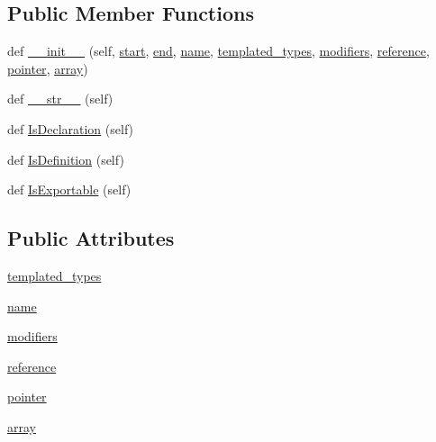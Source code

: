\subsection*{Public Member Functions}
\begin{DoxyCompactItemize}
\item 
def \hyperlink{classcpp_1_1ast_1_1_type_adc20d88db721b5d7b513c08a4d6753c9}{\+\_\+\+\_\+init\+\_\+\+\_\+} (self, \hyperlink{classcpp_1_1ast_1_1_node_a7b2aa97e6a049bb1a93aea48c48f1f44}{start}, \hyperlink{classcpp_1_1ast_1_1_node_a3c5e5246ccf619df28eca02e29d69647}{end}, \hyperlink{classcpp_1_1ast_1_1_type_a5905424e2b65f0215b6ecd73b4bfe24c}{name}, \hyperlink{classcpp_1_1ast_1_1_type_a7c38fcafa00dae6ee22bab783086a1a7}{templated\+\_\+types}, \hyperlink{classcpp_1_1ast_1_1_type_a0effa0a077eda79943e881955b4c51a5}{modifiers}, \hyperlink{classcpp_1_1ast_1_1_type_a8d2cddd631397c3bf86198cc420d584d}{reference}, \hyperlink{classcpp_1_1ast_1_1_type_a37234bb68915c93894cbc8e366c1eaad}{pointer}, \hyperlink{classcpp_1_1ast_1_1_type_a1fd0493e82da315bcb4c02b0cf2133a3}{array})
\item 
def \hyperlink{classcpp_1_1ast_1_1_type_a1a10eff21f6150b7e14bde3788fa069b}{\+\_\+\+\_\+str\+\_\+\+\_\+} (self)
\item 
def \hyperlink{classcpp_1_1ast_1_1_type_a590071a2bce7ea5140d7eb86c90f63bf}{Is\+Declaration} (self)
\item 
def \hyperlink{classcpp_1_1ast_1_1_type_aedff25dc3736e83388742e55fe29159b}{Is\+Definition} (self)
\item 
def \hyperlink{classcpp_1_1ast_1_1_type_a80dce781581c03e550ce51a9a33ca158}{Is\+Exportable} (self)
\end{DoxyCompactItemize}
\subsection*{Public Attributes}
\begin{DoxyCompactItemize}
\item 
\hyperlink{classcpp_1_1ast_1_1_type_a7c38fcafa00dae6ee22bab783086a1a7}{templated\+\_\+types}
\item 
\hyperlink{classcpp_1_1ast_1_1_type_a5905424e2b65f0215b6ecd73b4bfe24c}{name}
\item 
\hyperlink{classcpp_1_1ast_1_1_type_a0effa0a077eda79943e881955b4c51a5}{modifiers}
\item 
\hyperlink{classcpp_1_1ast_1_1_type_a8d2cddd631397c3bf86198cc420d584d}{reference}
\item 
\hyperlink{classcpp_1_1ast_1_1_type_a37234bb68915c93894cbc8e366c1eaad}{pointer}
\item 
\hyperlink{classcpp_1_1ast_1_1_type_a1fd0493e82da315bcb4c02b0cf2133a3}{array}
\end{DoxyCompactItemize}


